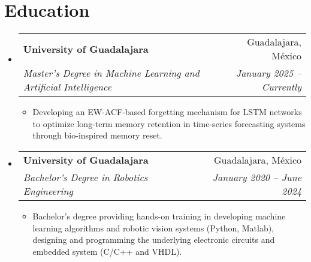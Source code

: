 \documentclass[a4paper,11pt]{article}
\makeatletter
\newcommand{\resumeItem}[1]{
  \item\small{
    {#1 \vspace{-2pt}}
  }
}
\newcommand{\resumeSubheading}[4]{
  \vspace{-2pt}\item
    \begin{tabular*}{1\textwidth}[t]{l@{\extracolsep{\fill}}r}
      \textbf{#1} & #2 \\
      \textit{\small#3} & \textit{\small #4} \\
    \end{tabular*}\vspace{-4pt}
}
\newcommand{\resumeSubHeadingListStart}{\begin{itemize}[leftmargin=0in, label={}]}
\newcommand{\resumeSubHeadingListEnd}{\end{itemize}}
\newcommand{\resumeItemListStart}{\begin{itemize}[leftmargin=0.15in, nosep]}
\newcommand{\resumeItemListEnd}{\end{itemize}\vspace{-2pt}}
\makeatother
\begin{document}
\section{\Large{Education}}
  \resumeSubHeadingListStart
    \resumeSubheading
      {University of Guadalajara}{Guadalajara, México}
      {Master's Degree in Machine Learning and Artificial Intelligence}{January 2025 -- Currently}
      \resumeItemListStart
        \resumeItem{Developing an EW-ACF-based forgetting mechanism for LSTM networks to optimize long-term memory retention in time-series forecasting systems through bio-inspired memory reset.}
      \resumeItemListEnd
    \resumeSubheading
      {University of Guadalajara}{Guadalajara, México}
      {Bachelor's Degree in Robotics Engineering}{January 2020 -- June 2024}
      \resumeItemListStart
        \resumeItem{Bachelor's degree providing hands-on training in developing machine learning algorithms and robotic vision systems (Python, Matlab), designing and programming the underlying electronic circuits and embedded system (C/C++ and VHDL).}
      \resumeItemListEnd
  \resumeSubHeadingListEnd
\vspace{-16pt}


\end{document}
